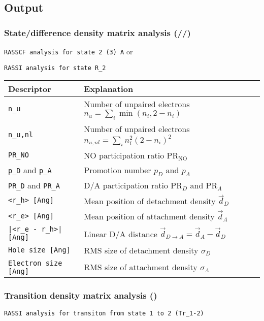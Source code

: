 \subsection{Output}
\label{UG:sec:wfa_output}

\subsubsection{State/difference density matrix analysis (//)}

\verb+RASSCF analysis for state 2 (3) A+ or

\verb+RASSI analysis for state R_2+

\begin{center}
\begin{tabular}{ll}
\hline
\textbf{Descriptor} & \textbf{Explanation} \\
\hline
\verb+n_u+ & Number of unpaired electrons $n_u=\sum_i\min(n_i, 2-n_i)$ \cite{Head-Gordon2003, Plasser2014}\\
\verb+n_u,nl+ & Number of unpaired electrons $n_{u,nl}=\sum_i n_i^2(2-n_i)^2$ \\
\verb+PR_NO+ & NO participation ratio $\mathrm{PR}_\mathrm{NO}$ \\
\verb+p_D+ and \verb+p_A+ & Promotion number $p_D$ and $p_A$ \\
\verb+PR_D+ and \verb+PR_A+ & D/A participation ratio $\mathrm{PR}_D$ and $\mathrm{PR}_A$ \\
\verb+<r_h> [Ang]+ & Mean position of detachment density $\vec{d}_D$ \cite{Plasser2015}\\
\verb+<r_e> [Ang]+ & Mean position of attachment density $\vec{d}_A$ \\
\verb+|<r_e - r_h>| [Ang]+ &
Linear D/A distance $\vec{d}_{D\rightarrow A} = \vec{d}_A - \vec{d}_D$ \\
\verb+Hole size [Ang]+ &
RMS size of detachment density $\sigma_D$ \\
\verb+Electron size [Ang]+ &
RMS size of attachment density $\sigma_A$ \\
\hline
\end{tabular}
\end{center}

\subsubsection{Transition density matrix analysis ()}

\verb+RASSI analysis for transiton from state 1 to 2 (Tr_1-2)+

